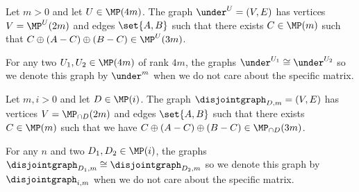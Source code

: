 \begin{definition} \label{def:subposet-graph}
    Let \(m > 0\) and let \(U \in \MP(4m)\). The graph \(\under^U = (V,E)\) has vertices \(V = \MP^U(2m)\) and edges \(\set{A,B}\) such that there exists \(C \in \MP(m)\) such that \(C \oplus (A-C) \oplus (B-C) \in \MP^{U}(3m)\).
\end{definition}
For any two \(U_1,U_2 \in \MP(4m)\) of rank \(4m\), the graphs \(\under^{U_1} \cong \under^{U_2}\) so we denote this graph by \(\under^m\) when we do not care about the specific matrix.

\begin{definition} \label{def:disjoint-graph}
    Let \(m,i > 0\) and let \(D \in \MP(i)\). The graph \(\disjointgraph_{D,m} = (V,E)\) has vertices \(V = \MP_{\cap D}(2m)\) and edges \(\set{A,B}\) such that there exists \(C \in \MP(m)\) such that we have \(C \oplus (A-C) \oplus (B-C) \in \MP_{\cap D}(3m)\).
\end{definition}
For any \(n\) and two \(D_1,D_2 \in \MP(i)\), the graphs \(\disjointgraph_{D_1,m} \cong \disjointgraph_{D_2,m}\) so we denote this graph by \(\disjointgraph_{i,m}\) when we do not care about the specific matrix.

\medskip


